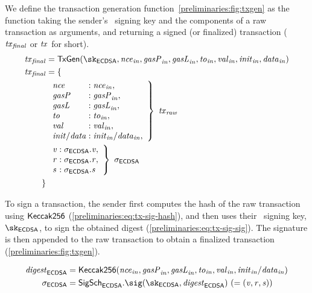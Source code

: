 We define the transaction generation function~\cref{preliminaries:fig:txgen} as the function taking the sender's \ecdsa~signing key and the components of a raw transaction as arguments, and returning a signed (or finalized) transaction ($\mathit{\mathit{tx}_{final}}$ or $\mathit{tx}$ for short).
\begin{align*}
    \finalTx &= \txgen(\sk_{\ecdsa}, \inp{\nonce}, \inp{\gasp}, \inp{\gasl}, \inp{\tto}, \inp{\val}, \inp{\init}, \inp{\data})\\
    \finalTx &= \{ \\
                & \left.
                \begin{array}{l@{}l}
                    \nonce & {}: \inp{\nonce},\\
                    \gasp & {}: \inp{\gasp},\\
                    \gasl & {}: \inp{\gasl},\\
                    \tto & {}: \inp{\tto},\\
                    \val & {}: \inp{\val},\\
                    \init/\data & {}: \inp{\init}/\inp{\data},
                \end{array}
                \right\rbrace~\rawTx\\
                & \left.
                \begin{array}{l@{}l}
                    \sigv & {}: \sigma_\ecdsa.\sigv,\\
                    \sigr & {}: \sigma_\ecdsa.\sigr,\\
                    \sigs & {}: \sigma_\ecdsa.\sigs \\
                \end{array}
                \right\rbrace~\sigma_\ecdsa\\
                \}
\end{align*}

To sign a transaction, the sender first computes the hash of the raw transaction using $\mathsf{Keccak{256}}$ (\cref{preliminaries:eq:tx-sig-hash}), and then uses their \ecdsa~signing key, $\sk_\ecdsa$, to sign the obtained digest (\cref{preliminaries:eq:tx-sig-sig}). The signature is then appended to the raw transaction to obtain a finalized transaction (\cref{preliminaries:fig:txgen}).

\begin{align}
    \digest_\ecdsa &= \keccak{256}(\inp{\nonce}, \inp{\gasp}, \inp{\gasl}, \inp{\tto}, \inp{\val}, \inp{\init}/\inp{\data}) \label{preliminaries:eq:tx-sig-hash} \\
    \sigma_{\ecdsa} &= \ecdsasigscheme.\sig(\sk_\ecdsa, \digest_\ecdsa)\ (= \smalltuple{\sigv, \sigr, \sigs}) \label{preliminaries:eq:tx-sig-sig}
\end{align}

